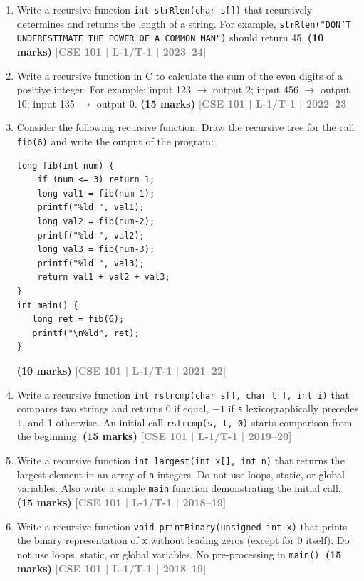 \documentclass[12pt,a3paper]{article}
\newcommand{\yr}[1]{\hfill\textcolor{gray}{\small\textbf{[#1]}}}
\newcommand{\mk}[1]{\textcolor{orange!70!black}{\small\textbf{(#1 marks)}}}
\begin{document}
\begin{enumerate}

\item Write a recursive function \texttt{int strRlen(char s[])} that recursively determines and returns the length of a string. For example, \texttt{strRlen("DON'T UNDERESTIMATE THE POWER OF A COMMON MAN")} should return 45.
\mk{10} \yr{CSE 101 | L-1/T-1 | 2023--24}

\item Write a recursive function in C to calculate the sum of the even digits of a positive integer. For example: input 123 $\to$ output 2; input 456 $\to$ output 10; input 135 $\to$ output 0.
\mk{15} \yr{CSE 101 | L-1/T-1 | 2022--23}

\item Consider the following recursive function. Draw the recursive tree for the call \texttt{fib(6)} and write the output of the program:
 
\begin{lstlisting}
long fib(int num) {
    if (num <= 3) return 1;
    long val1 = fib(num-1);
    printf("%ld ", val1);
    long val2 = fib(num-2); 
    printf("%ld ", val2);
    long val3 = fib(num-3); 
    printf("%ld ", val3);
    return val1 + val2 + val3;
}
int main() {
   long ret = fib(6); 
   printf("\n%ld", ret); 
}
\end{lstlisting}
\mk{10} \yr{CSE 101 | L-1/T-1 | 2021--22}



\item Write a recursive function \texttt{int rstrcmp(char s[], char t[], int i)} that compares two strings and returns 0 if equal, $-1$ if \texttt{s} lexicographically precedes \texttt{t}, and 1 otherwise. An initial call \texttt{rstrcmp(s, t, 0)} starts comparison from the beginning.
\mk{15} \yr{CSE 101 | L-1/T-1 | 2019--20}

\item Write a recursive function \texttt{int largest(int x[], int n)} that returns the largest element in an array of \texttt{n} integers. Do not use loops, static, or global variables. Also write a simple \texttt{main} function demonstrating the initial call.
\mk{15} \yr{CSE 101 | L-1/T-1 | 2018--19}

\item Write a recursive function \texttt{void printBinary(unsigned int x)} that prints the binary representation of \texttt{x} without leading zeros (except for 0 itself). Do not use loops, static, or global variables. No pre-processing in \texttt{main()}.
\mk{15} \yr{CSE 101 | L-1/T-1 | 2018--19}


\end{enumerate}
\end{document}
